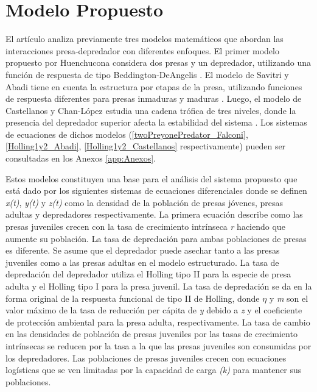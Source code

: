 \documentclass{wscpaperproc}
\theoremstyle{wsc}
\begin{document}
\section{Modelo Propuesto}

El artículo analiza previamente tres modelos matemáticos que abordan las interacciones presa-depredador con diferentes enfoques. El
primer modelo propuesto por Huenchucona considera dos presas y un depredador, utilizando una
función de respuesta de tipo Beddington-DeAngelis \cite{falconi_stability_2015}. El modelo de Savitri y Abadi tiene en cuenta la estructura
por etapas de la presa, utilizando funciones de respuesta diferentes para presas inmaduras y maduras \cite{savitri_dynamics_2018}. Luego, el
modelo de Castellanos y Chan-López estudia una cadena trófica de tres niveles, donde la presencia del depredador
superior afecta la estabilidad del sistema \cite{castellanos_existence_2017}. Los sistemas de ecuaciones de dichos modelos (\ref{twoPreyonePredator_Falconi}, \ref{Holling1y2_Abadi},
\ref{Holling1y2_Castellanos} respectivamente) pueden ser consultadas en los Anexos \ref{app:Anexos}.\par

Estos modelos constituyen una base para el análisis
del sistema propuesto que está dado por los siguientes sistemas de ecuaciones diferenciales donde se definen \emph{x(t)}, \emph{y(t)} y \emph{z(t)} como la
densidad de la poblaci\'on de presas j\'ovenes, presas adultas y depredadores respectivamente.
La primera ecuación describe como las presas juveniles crecen con la tasa de crecimiento intrínseca \emph{r} haciendo que aumente su población. La tasa de depredación para ambas 
poblaciones de presas es diferente. Se asume que el depredador puede asechar tanto a las presas juveniles como a las presas adultas en el modelo estructurado. 
La tasa de depredación del depredador utiliza el Holling tipo II
para la especie de presa adulta y el Holling tipo I para la presa juvenil. La tasa de depredación se da en la forma original de la respuesta funcional
de tipo II de Holling, donde $\eta$  y \emph{m} son el valor máximo de la tasa de reducción per cápita de \emph{y} debido a \emph{z} y el coeficiente
de protección ambiental para la presa adulta, respectivamente. La tasa de cambio en las densidades de población de presas juveniles por las tasas de crecimiento intrínsecas se
reducen por la tasa a la que las presas juveniles son consumidas por los depredadores. Las poblaciones de presas juveniles crecen con ecuaciones logísticas
que se ven limitadas por la capacidad de carga \emph{(k)} para mantener sus poblaciones.\par
\end{document}

